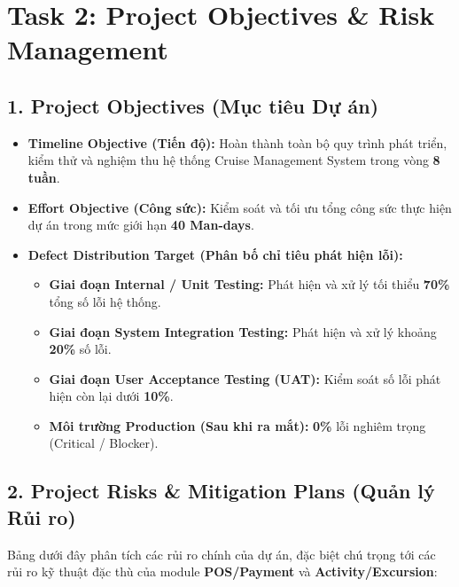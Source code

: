 \documentclass[12pt,a4paper]{article}
\begin{document}
	
	\section*{Task 2: Project Objectives \& Risk Management}
	
	\subsection*{1. Project Objectives (Mục tiêu Dự án)}
	
	\begin{itemize}
		\item \textbf{Timeline Objective (Tiến độ):} Hoàn thành toàn bộ quy trình phát triển, kiểm thử và nghiệm thu hệ thống Cruise Management System trong vòng \textbf{8 tuần}.
		\item \textbf{Effort Objective (Công sức):} Kiểm soát và tối ưu tổng công sức thực hiện dự án trong mức giới hạn \textbf{40 Man-days}.
		\item \textbf{Defect Distribution Target (Phân bố chỉ tiêu phát hiện lỗi):}
		\begin{itemize}
			\item \textbf{Giai đoạn Internal / Unit Testing:} Phát hiện và xử lý tối thiểu \textbf{70\%} tổng số lỗi hệ thống.
			\item \textbf{Giai đoạn System Integration Testing:} Phát hiện và xử lý khoảng \textbf{20\%} số lỗi.
			\item \textbf{Giai đoạn User Acceptance Testing (UAT):} Kiểm soát số lỗi phát hiện còn lại dưới \textbf{10\%}.
			\item \textbf{Môi trường Production (Sau khi ra mắt):} \textbf{0\%} lỗi nghiêm trọng (Critical / Blocker).
		\end{itemize}
	\end{itemize}
	
	\subsection*{2. Project Risks \& Mitigation Plans (Quản lý Rủi ro)}
	
	Bảng dưới đây phân tích các rủi ro chính của dự án, đặc biệt chú trọng tới các rủi ro kỹ thuật đặc thù của module \textbf{POS/Payment} và \textbf{Activity/Excursion}:
	
\end{document}
